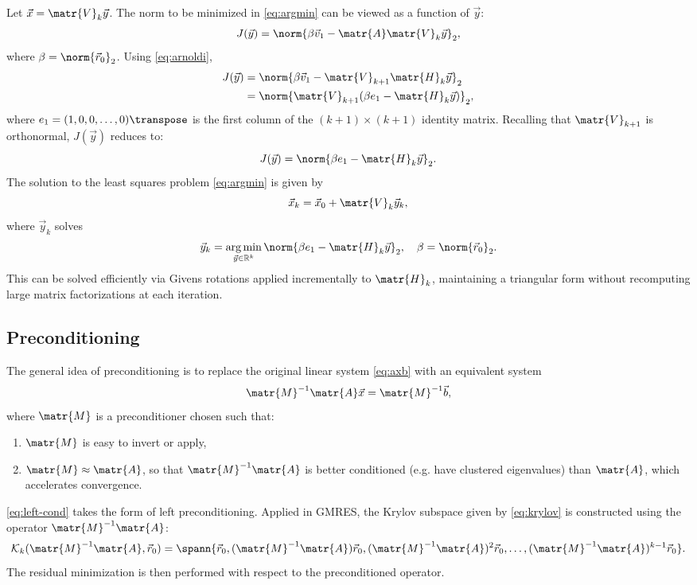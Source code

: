 Let \(\vec{x} = \matr{V}_k \vec{y}\). The norm to be minimized in \eqref{eq:argmin} can be
viewed as a function of \(\vec{y}\): \[J(\vec{y}) = \norm{\beta \vec{v}_1 -
    \matr{A} \matr{V}_k \vec{y}}_2 ,\] where \(\beta = \norm{\vec{r}_0}_2\).
Using \eqref{eq:arnoldi},
\begin{align*}
  J(\vec{y}) & = \norm{\beta \vec{v}_1 - \matr{V}_{k+1} \matr{H}_k \vec{y}}_2 \\
  & = \norm{\matr{V}_{k+1} (\beta e_1 - \matr{H}_k \vec{y})}_2 ,
\end{align*}
where \(e_1 = (1, 0, 0, \dots, 0)\transpose\) is the first column of the \((k+1) \times
(k+1)\) identity matrix. Recalling that \(\matr{V}_{k+1}\) is orthonormal,
\(J(\vec{y})\) reduces to: \[J(\vec{y}) = \norm{\beta e_1 - \matr{H}_k
    \vec{y}}_2.\] The solution to the least squares problem \eqref{eq:argmin} is
given by
\begin{equation}
  \label{eq:gmres-ir}
  \vec{x}_k = \vec{x}_0 + \matr{V}_k \vec{y}_k,
\end{equation}
where \(\vec{y}_k\) solves \[\vec{y}_k = \argmin_{\vec{y} \in \mathbb{R}^k} \norm{\beta e_1 - \matr{H}_k \vec{y}}_2,
  \quad \beta = \norm{\vec{r}_0}_2.\] This can be solved efficiently via Givens
rotations \cite[p.\ 234]{golub_matrix_2013} applied incrementally to
\(\matr{H}_k\), maintaining a triangular form without recomputing large matrix
factorizations at each iteration.

\subsection{Preconditioning}
\label{sec:preconditioning-1}

The general idea of preconditioning is to replace the original linear system
\eqref{eq:axb} with an equivalent system
\begin{equation}
  \label{eq:left-cond}
  \matr{M}^{-1}\matr{A} \vec{x} = \matr{M}^{-1} \vec{b},
\end{equation}
where \(\matr{M}\) is a preconditioner chosen such that:
\begin{enumerate}
\item \(\matr{M}\) is easy to invert or apply,
\item \(\matr{M} \approx \matr{A}\), so that \(\matr{M}^{-1}\matr{A}\) is better
  conditioned (e.g. have clustered eigenvalues) than \(\matr{A}\), which
  accelerates convergence.
\end{enumerate}
\eqref{eq:left-cond} takes the form of left preconditioning. Applied in GMRES,
the Krylov subspace given by \eqref{eq:krylov} is constructed using the operator
\(\matr{M}^{-1}\matr{A}\):
\[
  \mathcal{K}_k(\matr{M}^{-1}\matr{A}, \vec{r}_0) = \spann{\vec{r}_0, (\matr{M}^{-1}\matr{A})\vec{r}_0,
    (\matr{M}^{-1}\matr{A})^2\vec{r}_0, \dots, (\matr{M}^{-1}\matr{A})^{k - 1}\vec{r}_0}.
\]
The residual minimization is then performed with respect to the preconditioned
operator.

